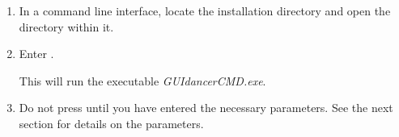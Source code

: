
\begin{enumerate}
\item In a command line interface, locate the \jb{} installation directory and open the \jb{} directory within it. 
\item Enter . 

This will run the executable \emph{GUIdancerCMD.exe}.
\item Do not press  until you have entered the necessary parameters. See the next section for details on the parameters.
\end{enumerate}
